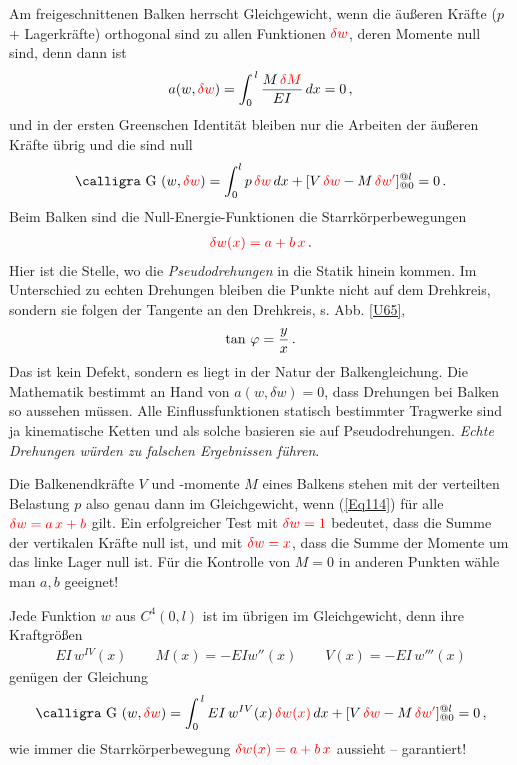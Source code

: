 {{{{{Am freigeschnittenen Balken herrscht Gleichgewicht, wenn die \"{a}u{\ss}eren Kr\"{a}fte ($p$ + Lagerkr\"{a}fte) orthogonal sind zu allen  Funktionen $\textcolor{red}{\delta w}$, deren Momente null sind, denn dann ist
\begin{align}
a(w,\textcolor{red}{\delta w}) = \int_0^{\,l} \frac{M\,\textcolor{red}{\delta M}}{EI}\,dx = 0\,,
\end{align}
und in der ersten Greenschen Identit\"{a}t bleiben nur die Arbeiten der \"{a}u{\ss}eren Kr\"{a}fte \"{u}brig und die sind null
\begin{align}\label{Eq114}
\text{\normalfont\calligra G\,\,}(w,\textcolor{red}{\delta w}) = \int_0^{l} p\,\textcolor{red}{\delta w}\,dx + [V\,\textcolor{red}{\delta w} - M\,\textcolor{red}{\delta w'}]_{@0}^{@l} = 0\,.
\end{align}
Beim Balken sind die \glq Null-Energie\grq{}-Funktionen die Starrk\"{o}rperbewegungen
\begin{align}
\textcolor{red}{\delta w(x) = a + b\,x}\,.
\end{align}
Hier ist die Stelle, wo die {\em Pseudodrehungen\/} in die Statik hinein kommen. Im Unterschied zu echten Drehungen bleiben die Punkte nicht auf dem Drehkreis, sondern sie folgen der Tangente an den Drehkreis, s. Abb. \ref{U65},
\begin{align}
\tan\,\varphi = \frac{y}{x}\,.
\end{align}
Das ist kein \glq Defekt\grq{}, sondern es liegt in der Natur der Balkengleichung. Die Mathematik bestimmt an Hand von $a(w,\delta w) = 0$, dass Drehungen bei Balken so aussehen m\"{u}ssen. Alle Einflussfunktionen statisch bestimmter Tragwerke sind ja kinematische Ketten und als solche basieren sie auf Pseudodrehungen. {\em Echte Drehungen w\"{u}rden zu falschen Ergebnissen f\"{u}hren\/}.

Die Balkenendkr\"{a}fte $V$ und -momente $M$ eines Balkens stehen mit der verteilten Belastung  $p$ also genau dann im Gleichgewicht, wenn (\ref{Eq114}) f\"{u}r alle $\textcolor{red}{\delta w = a\,x + b }$ gilt. Ein erfolgreicher Test mit $\textcolor{red}{\delta w = 1}$ bedeutet, dass die Summe der vertikalen Kr\"{a}fte null ist, und mit $\textcolor{red}{\delta w = x}$, dass die Summe der Momente um das linke Lager  null ist. F\"{u}r die Kontrolle von $M = 0$ in anderen Punkten w\"{a}hle man $a, b$ geeignet!

Jede Funktion $w $ aus $C^4(0,l)$ ist im \"{u}brigen im Gleichgewicht, denn ihre Kraftgr\"{o}{\ss}en
\begin{align}
EI\,w^{IV}(x) \qquad M(x) = - EI w''(x) \qquad V(x)= - EI\,w'''(x)
\end{align}
gen\"{u}gen der Gleichung
\begin{align}
\text{\normalfont\calligra G\,\,}(w,\textcolor{red}{\delta w}) = \int_0^{\,l} EI\,w^{IV}(x)\,\textcolor{red}{\delta w(x)}\,dx + [V\,\textcolor{red}{\delta w} - M\,\textcolor{red}{\delta w'}]_{@0}^{@l} = 0\,,
\end{align}
wie immer die Starrk\"{o}rperbewegung $\textcolor{red}{\delta w(x) = a + b\,x}$ aussieht -- garantiert!

}}}}}

